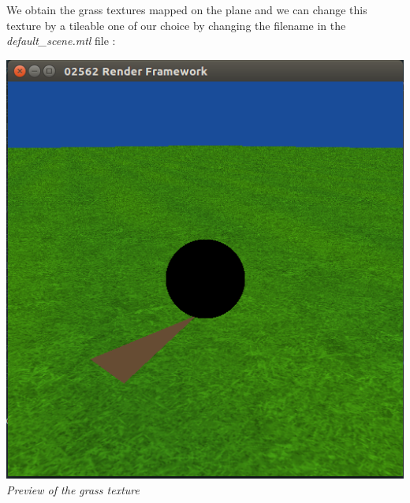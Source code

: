 \documentclass[a4,12pt]{article}
\begin{document}
	 We obtain the grass textures mapped on the plane and we can change this texture by a tileable one of our choice by changing the filename in the \textit{default\_scene.mtl} file :
	 \begin{center}
	 \begin{minipage}[b]{0.40\linewidth}
		 \begin{center}
		 	\includegraphics[width = \textwidth]{./Worksheet3/ScreenshotPreviewTexture.png}\\
		 	\textit{Preview of the grass texture}\\
		 	\hspace{1em}
		 \end{center}
	\end{minipage}
	\hspace{0.05\linewidth}
	\begin{minipage}[b]{0.40\linewidth}
		\begin{center}

\end{center}
\end{minipage}
\end{center}
\end{document}
